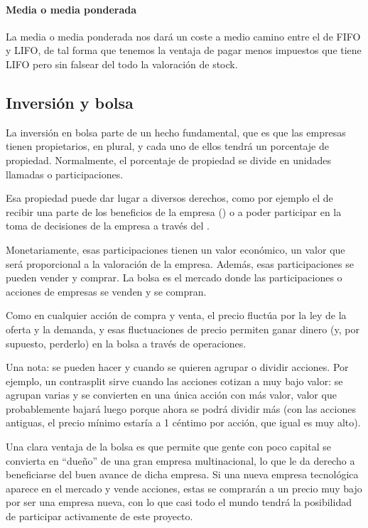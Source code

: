 \documentclass[nochap,palatino,shortheader]{apuntes}
\newcommand{\study}[1]{#1} \newcommand{\substudy}[1]{#1}
\begin{document}
\paragraph{\study{Media o media ponderada}} La media o media ponderada nos dará un coste a medio camino entre el de FIFO y LIFO, de tal forma que tenemos la ventaja de pagar menos impuestos que tiene LIFO pero sin falsear del todo la valoración de stock.

\subsection{Inversión y bolsa}

La inversión en bolsa parte de un hecho fundamental, que es que las empresas tienen propietarios, en plural, y cada uno de ellos tendrá un porcentaje de propiedad. Normalmente, el porcentaje de propiedad se divide en unidades llamadas  o participaciones.

Esa propiedad puede dar lugar a diversos derechos, como por ejemplo el de recibir una parte de los beneficios de la empresa () o a poder participar en la toma de decisiones de la empresa a través del .

Monetariamente, esas participaciones tienen un valor económico, un valor que será proporcional a la valoración de la empresa. Además, esas participaciones se pueden vender y comprar. La bolsa es el mercado donde las participaciones o acciones de empresas se venden y se compran.

Como en cualquier acción de compra y venta, el precio fluctúa por la ley de la oferta y la demanda, y esas fluctuaciones de precio permiten ganar dinero (y, por supuesto, perderlo) en la bolsa a través de operaciones.

Una nota: se pueden hacer  y  cuando se quieren agrupar o dividir acciones. Por ejemplo, un contrasplit sirve cuando las acciones cotizan a muy bajo valor: se agrupan varias y se convierten en una única acción con más valor, valor que probablemente bajará luego porque ahora se podrá dividir más (con las acciones antiguas, el precio mínimo estaría a 1 céntimo por acción, que igual es muy alto).

Una clara ventaja de la bolsa es que permite que gente con poco capital se convierta en ``dueño'' de una gran empresa multinacional, lo que le da derecho a beneficiarse del buen avance de dicha empresa. Si una nueva empresa tecnológica aparece en el mercado y vende acciones, estas se comprarán a un precio muy bajo por ser una empresa nueva, con lo que casi todo el mundo tendrá la posibilidad de participar activamente de este proyecto.
\end{document}
